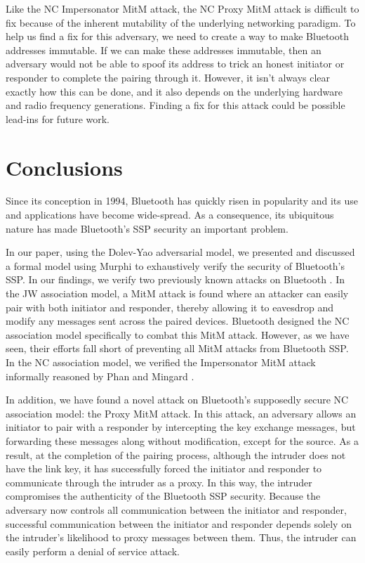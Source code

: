 \documentclass{acm_proc_article-sp}
\begin{document}
Like the NC Impersonator MitM attack, the NC Proxy MitM attack is difficult to fix because of the inherent mutability of the underlying networking paradigm. To help us find a fix for this adversary, we need to create a way to make Bluetooth addresses immutable. If we can make these addresses immutable, then an adversary would not be able to spoof its address to trick an honest initiator or responder to complete the pairing through it. However, it isn't always clear exactly how this can be done, and it also depends on the underlying hardware and radio frequency generations. Finding a fix for this attack could be possible lead-ins for future work.

\section{Conclusions}

Since its conception in 1994, Bluetooth has quickly risen in popularity and its use and applications have become wide-spread. As a consequence, its ubiquitous nature has made Bluetooth's SSP security an important problem.

In our paper, using the Dolev-Yao \cite{dolev:yao} adversarial model, we presented and discussed a formal model using Murphi to exhaustively verify the security of Bluetooth's SSP. In our findings, we verify two previously known attacks on Bluetooth \cite{phan:mingard}. In the JW association model, a MitM attack is found where an attacker can easily pair with both initiator and responder, thereby allowing it to eavesdrop and modify any messages sent across the paired devices. Bluetooth designed the NC association model specifically to combat this MitM attack. However, as we have seen, their efforts fall short of preventing all MitM attacks from Bluetooth SSP. In the NC association model, we verified the Impersonator MitM attack informally reasoned by Phan and Mingard \cite{phan:mingard}.

In addition, we have found a novel attack on Bluetooth's supposedly secure NC association model: the Proxy MitM attack. In this attack, an adversary allows an initiator to pair with a responder by intercepting the key exchange messages, but forwarding these messages along without modification, except for the source. As a result, at the completion of the pairing process, although the intruder does not have the link key, it has successfully forced the initiator and responder to communicate through the intruder as a proxy. In this way, the intruder compromises the authenticity of the Bluetooth SSP security. Because the adversary now controls all communication between the initiator and responder, successful communication between the initiator and responder depends solely on the intruder's likelihood to proxy messages between them. Thus, the intruder can easily perform a denial of service attack.
\end{document}
